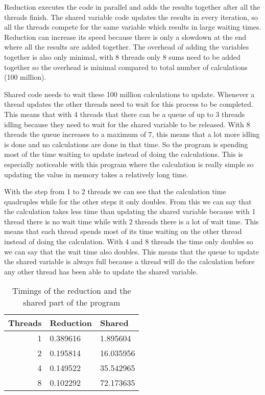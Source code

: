 \documentclass[a4paper]{article}
\begin{document}
\begin{enumerate}[(a)]
	Reduction executes the code in parallel and adds the results together after all the threads finish. The shared variable code updates the results in every iteration, so all the threads compete for the same variable which results in large waiting times. Reduction can increase its speed because there is only a slowdown at the end where all the results are added together. The overhead of adding the variables together is also only minimal, with 8 threads only 8 sums need to be added together so the overhead is minimal compared to total number of calculations (100 million).
	
	Shared code needs to wait these 100 million calculations to update. Whenever a thread updates the other threads need to wait for this process to be completed. This means that with 4 threads that there can be a queue of up to 3 threads idling because they need to wait for the shared variable to be released. With 8 threads the queue increases to a maximum of 7, this means that a lot more idling is done and no calculations are done in that time. So the program is spending most of the time waiting to update instead of doing the calculations. This is especially noticeable with this program where the calculation is really simple so updating the value in memory takes a relatively long time.
	
	With the step from 1 to 2 threads we can see that the calculation time quadruples while for the other steps it only doubles. From this we can say that the calculation takes less time than updating the shared variable because with 1 thread there is no wait time while with 2 threads there is a lot of wait time. This means that each thread spends most of its time waiting on the other thread instead of doing the calculation. With 4 and 8 threads the time only doubles so we can say that the wait time also doubles. This means that the queue to update the shared variable is always full because a thread will do the calculation before any other thread has been able to update the shared variable.
\end{enumerate}

\begin{table}
	\centering
	\caption{Timings of the reduction and the shared part of the program}
	\label{tbl:shared}
	\begin{tabular}{r|l|l}
		Threads & Reduction & Shared \\ \hline
		1 & 0.389616 & 1.895604 \\
		2 & 0.195814 & 16.035956 \\
		4 & 0.149522 & 35.542965 \\
		8 & 0.102292 & 72.173635
	\end{tabular}
\end{table}
\end{document}
